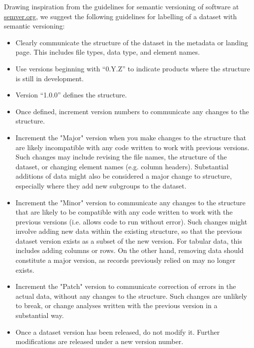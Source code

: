 \documentclass[a4paper,num-refs]{oup-contemporary}
\begin{document}
Drawing inspiration from the guidelines for semantic versioning of software at \href{http://semver.org/}{semver.org}, we suggest the following guidelines for labelling of a dataset with semantic versioning:
\begin{itemize}
  \item Clearly communicate the structure of the dataset in the metadata or landing page. This includes file types, data type, and element names.
  \item Use versions beginning with ``0.Y.Z'' to indicate products where the structure is still in development.
  \item Version ``1.0.0'' defines the structure. 
  \item Once defined, increment version numbers to communicate any changes to the structure.
  \item Increment the "Major" version when you make changes to the structure that are likely incompatible with any code written to work with previous versions. Such changes may include revising the file names, the structure of the dataset, or changing element names (e.g. column headers). Substantial additions of data might also be considered a major change to structure, especially where they add new subgroups to the dataset.
  \item Increment the "Minor" version to communicate any changes to the structure that are likely to be compatible with any code written to work with the previous versions (i.e. allows code to run without error). Such changes might involve adding new data within the existing structure, so that the previous dataset version exists as a subset of the new version. For tabular data, this includes adding columns or rows. On the other hand, removing data should constitute a major version, as records previously relied on may no longer exists.
  \item Increment the "Patch" version to communicate correction of errors in the actual data, without any changes to the structure. Such changes are unlikely to break, or change analyses written with the previous version in a substantial way.
  \item Once a dataset version has been released, do not modify it. Further modifications are released under a new version number.
\end{itemize}
\end{document}
